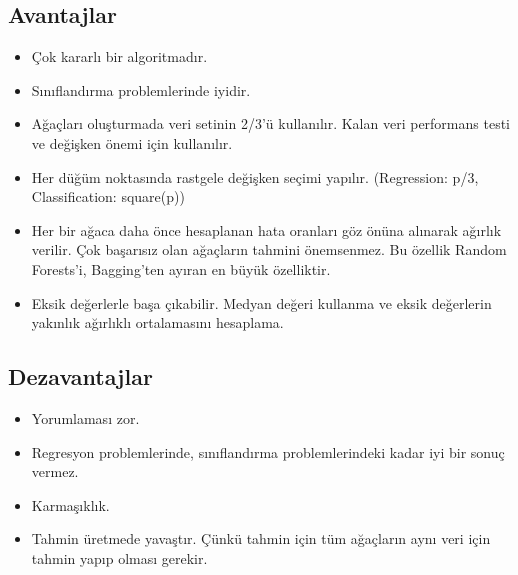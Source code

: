 \subsection{Avantajlar}
\begin{itemize}
    \item Çok kararlı bir algoritmadır.
    \item Sınıflandırma problemlerinde iyidir.
    \item Ağaçları oluşturmada veri setinin 2/3'ü kullanılır. Kalan veri performans testi ve değişken önemi için kullanılır.
    \item Her düğüm noktasında rastgele değişken seçimi yapılır. (Regression: p/3, Classification: square(p))
    \item Her bir ağaca daha önce hesaplanan hata oranları göz önüna alınarak ağırlık verilir. Çok başarısız olan ağaçların tahmini önemsenmez. Bu özellik Random Forests'i, Bagging'ten ayıran en büyük özelliktir.
    \item Eksik değerlerle başa çıkabilir. Medyan değeri kullanma ve eksik değerlerin yakınlık ağırlıklı ortalamasını hesaplama.
\end{itemize}

\subsection{Dezavantajlar}
\begin{itemize}
    \item Yorumlaması zor.
    \item Regresyon problemlerinde, sınıflandırma problemlerindeki kadar iyi bir sonuç vermez.
    \item Karmaşıklık.
    \item Tahmin üretmede yavaştır. Çünkü tahmin için tüm ağaçların aynı veri için tahmin yapıp olması gerekir.
\end{itemize}

